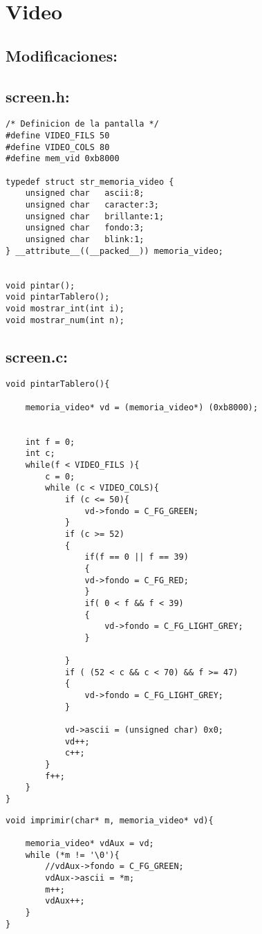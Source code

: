 
\section{Video}
\subsection{Modificaciones:}



\subsection{screen.h:}
\begin{codesnippet}
\begin{verbatim}
/* Definicion de la pantalla */
#define VIDEO_FILS 50	
#define VIDEO_COLS 80	
#define mem_vid 0xb8000

typedef struct str_memoria_video {
	unsigned char   ascii:8;
	unsigned char   caracter:3;
	unsigned char   brillante:1;
	unsigned char   fondo:3;
    unsigned char   blink:1; 
} __attribute__((__packed__)) memoria_video;


void pintar();
void pintarTablero();
void mostrar_int(int i);
void mostrar_num(int n);
\end{verbatim}
\end{codesnippet}

\subsection{screen.c:}

\begin{codesnippet}
\begin{verbatim}
void pintarTablero(){

	memoria_video* vd = (memoria_video*) (0xb8000);

	
	int f = 0;
	int c;
	while(f < VIDEO_FILS ){
		c = 0;
		while (c < VIDEO_COLS){
			if (c <= 50){
				vd->fondo = C_FG_GREEN;
			}
			if (c >= 52)
			{
				if(f == 0 || f == 39)
				{
				vd->fondo = C_FG_RED;
				}
				if( 0 < f && f < 39)
				{
					vd->fondo = C_FG_LIGHT_GREY;
				}
				
			}
			if ( (52 < c && c < 70) && f >= 47)
			{
				vd->fondo = C_FG_LIGHT_GREY;
			}
			
			vd->ascii = (unsigned char) 0x0;
			vd++;	
			c++;
		}
		f++;
	}
}
\end{verbatim}
\end{codesnippet}

\begin{codesnippet}
\begin{verbatim}
void imprimir(char* m, memoria_video* vd){
	
	memoria_video* vdAux = vd;
	while (*m != '\0'){
		//vdAux->fondo = C_FG_GREEN;
		vdAux->ascii = *m;
		m++;
		vdAux++;
	}
}
\end{verbatim}
\end{codesnippet}


